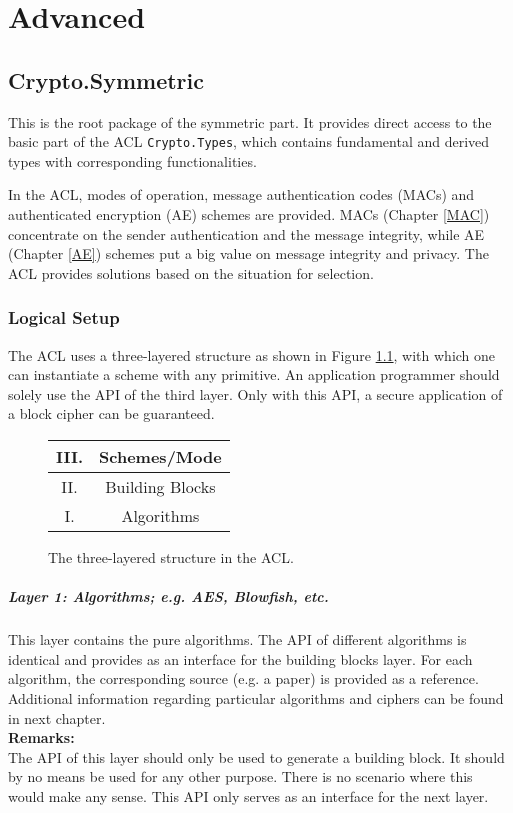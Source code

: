\part{Advanced}
\chapter{Crypto.Symmetric}
This is the root package of the symmetric part. It provides direct access to the basic part of the ACL \texttt{Crypto.Types}, which contains fundamental and derived types with corresponding functionalities.

In the ACL, modes of operation, message authentication codes (MACs) and authenticated encryption (AE) schemes are provided. MACs (Chapter \ref{MAC}) concentrate on the sender authentication and the message integrity, while AE (Chapter \ref{AE}) schemes put a big value on message integrity and privacy.
The ACL provides solutions based on the situation for selection.
\section{Logical Setup}
The ACL uses a three-layered structure as shown in Figure \ref{scheme}, with which one can instantiate a scheme with any primitive. An application programmer should solely use the API of the third layer. Only with this API, a secure application of a block cipher can be guaranteed.
\begin{figure}
  \begin{center}
    \huge
    \begin{tabular}{|c @{\ } c|}\hline
      III. &Schemes/Mode\\
      \hline
      II. & Building Blocks\\
      \hline
      I. & Algorithms\\
    \hline
    \end{tabular}
  \end{center}
\caption{The three-layered structure in the ACL.}\label{scheme}
\end{figure}
\subsubsection{Layer 1: Algorithms; e.g. AES, Blowfish, etc.}
This layer contains the pure algorithms. The API of different algorithms is identical and provides as an interface for the building blocks layer.
For each algorithm, the corresponding source (e.g. a paper) is provided as a reference. 
Additional information regarding particular algorithms and ciphers can be found in next chapter. \\ 
\textbf{Remarks:}\\
The API of this layer should only be used to generate a building block.
It should by no means be used for any other purpose. There is no scenario where this would make any sense. This API only serves as an interface for the next layer.

